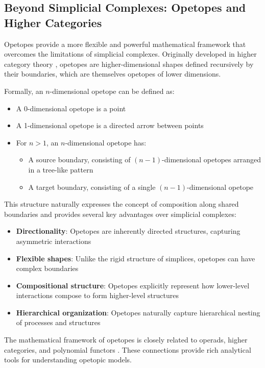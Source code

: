\subsection{Beyond Simplicial Complexes: Opetopes and Higher Categories}
Opetopes provide a more flexible and powerful mathematical framework that overcomes the limitations of simplicial complexes. Originally developed in higher category theory \citep{cheng2004higher, kock2010polynomial}, opetopes are higher-dimensional shapes defined recursively by their boundaries, which are themselves opetopes of lower dimensions.

Formally, an $n$-dimensional opetope can be defined as:
\begin{itemize}
    \item A 0-dimensional opetope is a point
    \item A 1-dimensional opetope is a directed arrow between points
    \item For $n>1$, an $n$-dimensional opetope has:
    \begin{itemize}
        \item A source boundary, consisting of $(n-1)$-dimensional opetopes arranged in a tree-like pattern
        \item A target boundary, consisting of a single $(n-1)$-dimensional opetope
    \end{itemize}
\end{itemize}

This structure naturally expresses the concept of composition along shared boundaries and provides several key advantages over simplicial complexes:

\begin{itemize}
    \item \textbf{Directionality}: Opetopes are inherently directed structures, capturing asymmetric interactions
    \item \textbf{Flexible shapes}: Unlike the rigid structure of simplices, opetopes can have complex boundaries
    \item \textbf{Compositional structure}: Opetopes explicitly represent how lower-level interactions compose to form higher-level structures
    \item \textbf{Hierarchical organization}: Opetopes naturally capture hierarchical nesting of processes and structures
\end{itemize}

The mathematical framework of opetopes is closely related to operads, higher categories, and polynomial functors \citep{baez2020network, leinster2004higher}. These connections provide rich analytical tools for understanding opetopic models.


